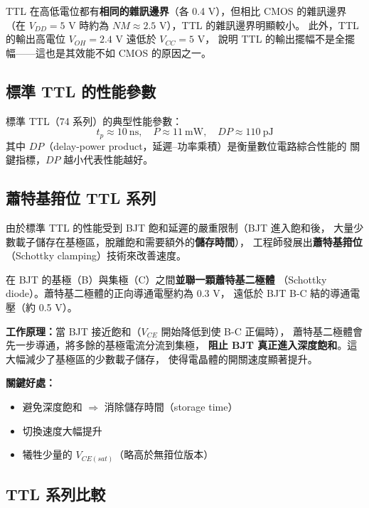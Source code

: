 \documentclass[12pt]{article}
\begin{document}
\noindent
TTL 在高低電位都有\textbf{相同的雜訊邊界}（各 0.4 V），但相比 CMOS 的雜訊邊界
（在 $V_{DD} = 5$ V 時約為 $NM \approx 2.5$ V），TTL 的雜訊邊界明顯較小。
此外，TTL 的輸出高電位 $V_{OH} = 2.4$ V 遠低於 $V_{CC} = 5$ V，
說明 TTL 的輸出擺幅不是全擺幅——這也是其效能不如 CMOS 的原因之一。

\subsection*{標準 TTL 的性能參數}

\begin{formulabox}
標準 TTL（74 系列）的典型性能參數：
\[
t_p \approx 10\ \text{ns},\quad P \approx 11\ \text{mW},\quad
DP \approx 110\ \text{pJ}
\]
其中 $DP$（delay-power product，延遲--功率乘積）是衡量數位電路綜合性能的
關鍵指標，$DP$ 越小代表性能越好。
\end{formulabox}

\subsection*{蕭特基箝位 TTL 系列}

由於標準 TTL 的性能受到 BJT 飽和延遲的嚴重限制（BJT 進入飽和後，
大量少數載子儲存在基極區，脫離飽和需要額外的\textbf{儲存時間}），
工程師發展出\textbf{蕭特基箝位}（Schottky clamping）技術來改善速度。

\begin{keybox}[蕭特基箝位的物理原理]
在 BJT 的基極（B）與集極（C）之間\textbf{並聯一顆蕭特基二極體}
（Schottky diode）。蕭特基二極體的正向導通電壓約為 0.3 V，
遠低於 BJT B-C 結的導通電壓（約 0.5 V）。

\textbf{工作原理：}當 BJT 接近飽和（$V_{CE}$ 開始降低到使 B-C 正偏時），
蕭特基二極體會先一步導通，將多餘的基極電流分流到集極，
\textbf{阻止 BJT 真正進入深度飽和}。這大幅減少了基極區的少數載子儲存，
使得電晶體的開關速度顯著提升。

\textbf{關鍵好處：}
\begin{itemize}[leftmargin=1.8em,itemsep=1pt]
\item 避免深度飽和 $\Rightarrow$ 消除儲存時間（storage time）
\item 切換速度大幅提升
\item 犧牲少量的 $V_{CE(sat)}$（略高於無箝位版本）
\end{itemize}
\end{keybox}

\subsection*{TTL 系列比較}
\end{document}
